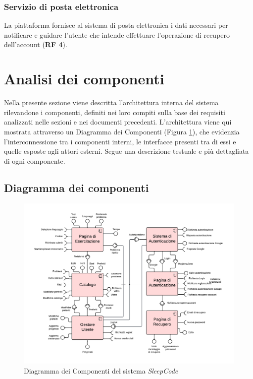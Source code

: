 \documentclass[11pt, a4paper]{article}
\theoremstyle{definition} %
\begin{document}
\subsubsection*{Servizio di posta elettronica}
La piattaforma fornisce al sistema di posta elettronica i dati necessari
per notificare e guidare l'utente che intende effettuare l'operazione di
recupero dell'account (\textbf{RF 4}).



\newpage
\section{Analisi dei componenti}



Nella presente sezione viene descritta l'architettura interna del sistema
rilevandone i componenti, definiti nei loro compiti sulla base dei requisiti
analizzati nelle sezioni e nei documenti precedenti. L'architettura viene
qui mostrata attraverso un Diagramma dei Componenti (Figura \ref{compdiagram}), che evidenzia
l'interconnessione tra i componenti interni, le interfacce presenti tra di
essi e quelle esposte agli attori esterni. Segue una descrizione testuale
e più dettagliata di ogni componente.

\subsection{Diagramma dei componenti}
\begin{figure}[H]
\centering
\hspace*{-3cm}
\includegraphics[scale = 0.86]{materiale/componentdiagram.pdf}
\caption{Diagramma dei Componenti del sistema \textit{SleepCode}}
\label{compdiagram}
\end{figure}
\end{document}
